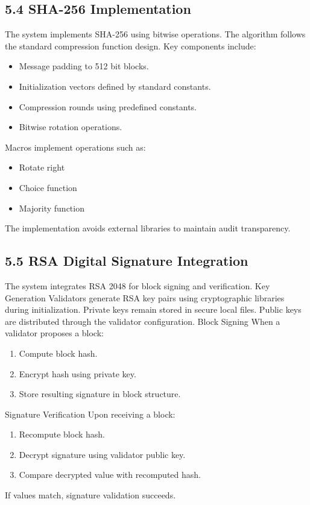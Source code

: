 \subsection*{5.4 SHA-256 Implementation}
The system implements SHA-256 using bitwise operations. The algorithm follows the standard compression function design.
Key components include:
\begin{itemize}
\item Message padding to 512 bit blocks.
\item Initialization vectors defined by standard constants.
\item Compression rounds using predefined constants.
\item Bitwise rotation operations.
\end{itemize}
Macros implement operations such as:
\begin{itemize}
\item Rotate right
\item Choice function
\item Majority function
\end{itemize}
The implementation avoids external libraries to maintain audit transparency.

\subsection*{5.5 RSA Digital Signature Integration}
The system integrates RSA 2048 for block signing and verification.
Key Generation
Validators generate RSA key pairs using cryptographic libraries during initialization. Private keys remain stored in secure local files. Public keys are distributed through the validator configuration.
Block Signing
When a validator proposes a block:
\begin{enumerate}
\item Compute block hash.
\item Encrypt hash using private key.
\item Store resulting signature in block structure.
\end{enumerate}
Signature Verification
Upon receiving a block:
\begin{enumerate}
\item Recompute block hash.
\item Decrypt signature using validator public key.
\item Compare decrypted value with recomputed hash.
\end{enumerate}
If values match, signature validation succeeds.

